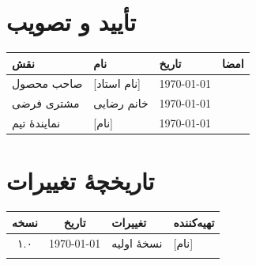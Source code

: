 \documentclass[12pt, a4paper]{article}
\begin{document}
\section{تأیید و تصویب}

\begin{center}
\begin{tabular}{|l|l|l|l|}
\hline
\textbf{نقش} & \textbf{نام} & \textbf{تاریخ} & \textbf{امضا} \\
\hline
صاحب محصول & [نام استاد] & \today & \\
\hline
مشتری فرضی & خانم رضایی & \today & \\
\hline
نمایندهٔ تیم & [نام] & \today & \\
\hline
\end{tabular}
\end{center}

\appendix
\section{تاریخچهٔ تغییرات}

\begin{center}
\begin{tabular}{|c|c|l|l|}
\hline
\textbf{نسخه} & \textbf{تاریخ} & \textbf{تغییرات} & \textbf{تهیه‌کننده} \\
\hline
۱.۰ & \today & نسخهٔ اولیه & [نام] \\
\hline
 & & & \\
\hline
\end{tabular}
\end{center}
\end{document}
